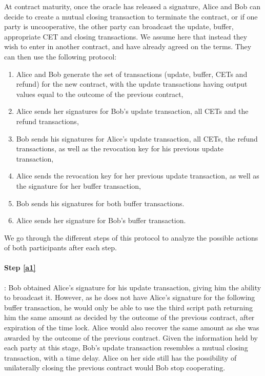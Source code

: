 At contract maturity, once the oracle has released a signature, Alice and Bob can decide to create a mutual closing transaction to terminate the contract, or if one party is uncooperative, the other party can broadcast the update, buffer, appropriate CET and closing transactions.
We assume here that instead they wish to enter in another contract, and have already agreed on the terms.
They can then use the following protocol:
\begin{enumerate}
  \item Alice and Bob generate the set of transactions (update, buffer, CETs and refund) for the new contract, with the update transactions having output values equal to the outcome of the previous contract,
  \item \label{a1} Alice sends her signatures for Bob's update transaction, all CETs and the refund transactions,
  \item \label{b1} Bob sends his signatures for Alice's update transaction, all CETs, the refund transactions, as well as the revocation key for his previous update transaction,
  \item \label{a2} Alice sends the revocation key for her previous update transaction, as well as the signature for her buffer transaction,
  \item \label{b2} Bob sends his signatures for both buffer transactions.
  \item \label{a3} Alice sends her signature for Bob's buffer transaction.
\end{enumerate}

We go through the different steps of this protocol to analyze the possible actions of both participants after each step.

\paragraph{Step \ref{a1}}: Bob obtained Alice's signature for his update transaction, giving him the ability to broadcast it.
However, as he does not have Alice's signature for the following buffer transaction, he would only be able to use the third script path returning him the same amount as decided by the outcome of the previous contract, after expiration of the time lock.
Alice would also recover the same amount as she was awarded by the outcome of the previous contract.
Given the information held by each party at this stage, Bob's update transaction resembles a mutual closing transaction, with a time delay.
Alice on her side still has the possibility of unilaterally closing the previous contract would Bob stop cooperating.

